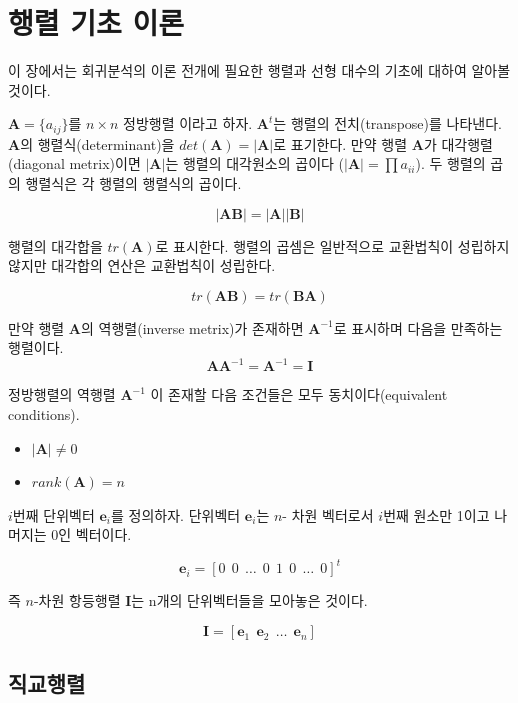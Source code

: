 \documentclass[
  10pt,
]{book}
\providecommand{\tightlist}{%
  \setlength{\itemsep}{0pt}\setlength{\parskip}{0pt}}
\theoremstyle{definition}
\theoremstyle{definition}
\theoremstyle{definition}
\theoremstyle{definition}
\theoremstyle{remark}
\begin{document}
\hypertarget{appendix-appendix}{%
\appendix {}}


\hypertarget{matrixalgebra}{%
\chapter{행렬 기초 이론}\label{matrixalgebra}}

이 장에서는 회귀분석의 이론 전개에 필요한 행렬과 선형 대수의 기초에 대하여 알아볼 것이다.

\(\bm A = \{ a_{ij} \}\)를 \(n \times n\) 정방행렬 이라고 하자. \(\bm A^t\)는 행렬의 전치(transpose)를 나타낸다. \(\bm A\)의 행렬식(determinant)을 \(det(\bm A)=|\bm A|\)로 표기한다. 만약 행렬 \(\bm A\)가 대각행렬(diagonal metrix)이면 \(|\bm A|\)는 행렬의 대각원소의 곱이다 (\(| \bm A| =\prod a_{ii}\)). 두 행렬의 곱의 행렬식은 각 행렬의 행렬식의 곱이다.

\[ |\bm A \bm B | = | \bm A| |\bm B| \]

행렬의 대각합을 \(tr(\bm A)\)로 표시한다. 행렬의 곱셈은 일반적으로 교환법칙이 성립하지 않지만 대각합의 연산은 교환법칙이 성립한다.

\[  tr(\bm A \bm B)  = tr( \bm B \bm A) \]

만약 행렬 \(\bm A\)의 역행렬(inverse metrix)가 존재하면 \(\bm A^{-1}\)로 표시하며 다음을 만족하는 행렬이다.
\[ \bm A \bm A^{-1} = \bm A^{-1} = \bm I \]

정방행렬의 역행렬 \(\bm A^{-1}\) 이 존재할 다음 조건들은 모두 동치이다(equivalent conditions).

\begin{itemize}
\tightlist
\item
  \(|\bm A| \ne 0\)
\item
  \(rank(\bm A) = n\)
\end{itemize}

\(i\)번째 단위벡터 \(\bm e_i\)를 정의하자. 단위벡터 \(\bm e_i\)는 \(n\)- 차원 벡터로서 \(i\)번째 원소만 1이고 나머지는 0인 벡터이다.

\[ \bm e_i = [0 ~~0 ~~\dots~~ 0 ~~ 1 ~~ 0 ~~ \dots ~~ 0 ]^t \]

즉 \(n\)-차원 항등행렬 \(\bm I\)는 n개의 단위벡터들을 모아놓은 것이다.

\[  \bm I = [ \bm e_1 ~~ \bm e_2 ~~ \dots ~~ \bm e_n ] \]

\hypertarget{uxc9c1uxad50uxd589uxb82c}{%
\section{직교행렬}\label{uxc9c1uxad50uxd589uxb82c}}
\end{document}
